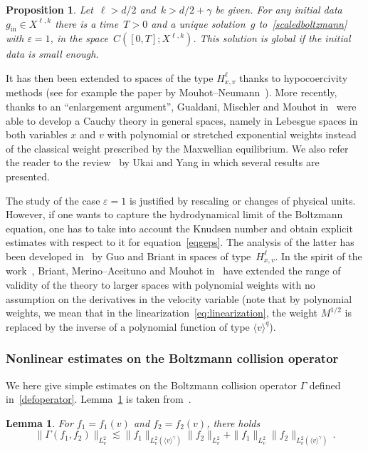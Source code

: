 \documentclass[11pt]{article}
\newtheorem{lemm}[theo]{Lemma}
\newtheorem{prop}[theo]{Proposition}
\theoremstyle{definition}
\numberwithin{equation}{section}
\numberwithin{figure}{section}
\numberwithin{table}{section}
\newcommand*\eps{{\varepsilon}}
\DeclareMathOperator{\inn}{in}
\begin{document}
\begin{prop}\label{propBoltzmannGradUkai}
Let~$\ell>d/2$ and~${k>d/2+\gamma}$ be given. For any initial data~$g_{\inn} \in X^{\ell,k}$ there is a time~$T>0$ and a unique solution~$g$ to~\eqref{scaledboltzmann} with $\eps=1$, in the space~$C([0,T]; X^{\ell,k})$. This solution is global if the initial data is small enough.
\end{prop}

It has then been extended to {spaces} of the type $H^\ell_{x,v}$ thanks to hypocoercivity methods (see for example the paper by Mouhot--Neumann~\cite{Mouhot-Neumann}). More recently, thanks to an ``enlargement argument'', Gualdani, Mischler and Mouhot in~\cite{GMM} were able to develop a Cauchy theory in general spaces, namely in Lebesgue spaces in both variables $x$ and $v$ with polynomial or stretched exponential weights instead of the classical weight prescribed by the Maxwellian equilibrium. We also refer the reader to the review~\cite{Ukai-Yang} by Ukai and Yang in which several results are presented.

The study of the case $\eps=1$ is justified by rescaling or changes of physical units. However, if one wants to capture the hydrodynamical limit of the Boltzmann equation, one has to take into account the Knudsen number and obtain explicit estimates with respect to it for equation~\eqref{eqgeps}. The analysis of the latter has been developed in~\cite{Briant,Guo} by Guo and Briant in spaces of type~$H^\ell_{x,v}$. In the spirit of the work~\cite{GMM}, Briant, Merino--Aceituno and Mouhot in~\cite{Briant-Mouhot-Merino} have extended the range of validity of the theory to larger spaces with polynomial weights with no assumption on the derivatives in the velocity variable (note that by polynomial weights, we mean that in the linearization~\eqref{eq:linearization}, the weight $M^{1/2}$ is replaced by the inverse of a polynomial function of type $\langle v \rangle^q$).

\subsubsection{Nonlinear estimates on the Boltzmann collision operator}
We here give simple estimates on the Boltzmann collision operator $\Gamma$ defined in~\eqref{defoperator}. Lemma~\ref{lem:GammaL2v} is taken from~\cite[Proposition~2.1.2]{Ukai-Yang}.

\begin{lemm}\label{lem:GammaL2v}
For $f_1=f_1(v)$ and $f_2=f_2(v)$, there holds
\[
\|\Gamma(f_1,f_2)\|_{L^2_v} \lesssim \|f_1\|_{L^2_v(\langle v \rangle^\gamma)} \|f_2\|_{L^2_v} + \|f_1\|_{L^2_v} \|f_2\|_{L^2_v(\langle v \rangle^\gamma)}\,.
\]
\end{lemm}
\end{document}

